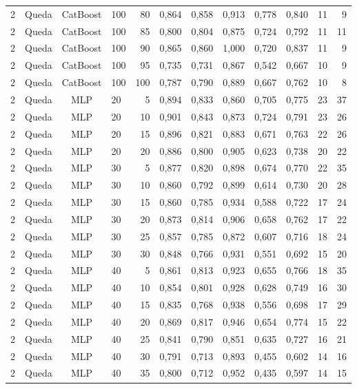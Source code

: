 \begin{longtable}{ccclrrrrrrrr}
2 & Queda & CatBoost & 100 & 80 & 0,864 & 0,858 & 0,913 & 0,778 & 0,840 & 11 & 9 \\
2 & Queda & CatBoost & 100 & 85 & 0,800 & 0,804 & 0,875 & 0,724 & 0,792 & 11 & 11 \\
2 & Queda & CatBoost & 100 & 90 & 0,865 & 0,860 & 1,000 & 0,720 & 0,837 & 11 & 9 \\
2 & Queda & CatBoost & 100 & 95 & 0,735 & 0,731 & 0,867 & 0,542 & 0,667 & 10 & 9 \\
2 & Queda & CatBoost & 100 & 100 & 0,787 & 0,790 & 0,889 & 0,667 & 0,762 & 10 & 8 \\
2 & Queda & MLP & 20 & 5 & 0,894 & 0,833 & 0,860 & 0,705 & 0,775 & 23 & 37 \\
2 & Queda & MLP & 20 & 10 & 0,901 & 0,843 & 0,873 & 0,724 & 0,791 & 23 & 26 \\
2 & Queda & MLP & 20 & 15 & 0,896 & 0,821 & 0,883 & 0,671 & 0,763 & 22 & 26 \\
2 & Queda & MLP & 20 & 20 & 0,886 & 0,800 & 0,905 & 0,623 & 0,738 & 20 & 22 \\
2 & Queda & MLP & 30 & 5 & 0,877 & 0,820 & 0,898 & 0,674 & 0,770 & 22 & 35 \\
2 & Queda & MLP & 30 & 10 & 0,860 & 0,792 & 0,899 & 0,614 & 0,730 & 20 & 28 \\
2 & Queda & MLP & 30 & 15 & 0,860 & 0,785 & 0,934 & 0,588 & 0,722 & 17 & 24 \\
2 & Queda & MLP & 30 & 20 & 0,873 & 0,814 & 0,906 & 0,658 & 0,762 & 17 & 22 \\
2 & Queda & MLP & 30 & 25 & 0,857 & 0,785 & 0,872 & 0,607 & 0,716 & 18 & 24 \\
2 & Queda & MLP & 30 & 30 & 0,848 & 0,766 & 0,931 & 0,551 & 0,692 & 15 & 20 \\
2 & Queda & MLP & 40 & 5 & 0,861 & 0,813 & 0,923 & 0,655 & 0,766 & 18 & 35 \\
2 & Queda & MLP & 40 & 10 & 0,854 & 0,801 & 0,928 & 0,628 & 0,749 & 16 & 30 \\
2 & Queda & MLP & 40 & 15 & 0,835 & 0,768 & 0,938 & 0,556 & 0,698 & 17 & 29 \\
2 & Queda & MLP & 40 & 20 & 0,869 & 0,817 & 0,946 & 0,654 & 0,774 & 15 & 22 \\
2 & Queda & MLP & 40 & 25 & 0,841 & 0,790 & 0,851 & 0,635 & 0,727 & 16 & 21 \\
2 & Queda & MLP & 40 & 30 & 0,791 & 0,713 & 0,893 & 0,455 & 0,602 & 14 & 16 \\
2 & Queda & MLP & 40 & 35 & 0,800 & 0,712 & 0,952 & 0,435 & 0,597 & 14 & 15 \\

\end{longtable}
